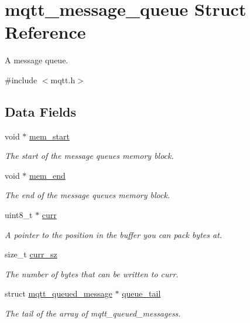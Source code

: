 \hypertarget{structmqtt__message__queue}{}\section{mqtt\+\_\+message\+\_\+queue Struct Reference}
\label{structmqtt__message__queue}


A message queue.  




{\ttfamily \#include $<$mqtt.\+h$>$}

\subsection*{Data Fields}
\begin{DoxyCompactItemize}
\item 
void $\ast$ \hyperlink{structmqtt__message__queue_a426875f05e72315ed1b34d324b60ac9b}{mem\+\_\+start}
\begin{DoxyCompactList}\small\item\em The start of the message queue\textquotesingle{}s memory block. \end{DoxyCompactList}\item 
void $\ast$ \hyperlink{structmqtt__message__queue_a07b338b8de56733f174ba367335bb8b0}{mem\+\_\+end}\hypertarget{structmqtt__message__queue_a07b338b8de56733f174ba367335bb8b0}{}\label{structmqtt__message__queue_a07b338b8de56733f174ba367335bb8b0}

\begin{DoxyCompactList}\small\item\em The end of the message queue\textquotesingle{}s memory block. \end{DoxyCompactList}\item 
uint8\+\_\+t $\ast$ \hyperlink{structmqtt__message__queue_a6fdfd281cd9d9ac4bfa69840e5cbd359}{curr}
\begin{DoxyCompactList}\small\item\em A pointer to the position in the buffer you can pack bytes at. \end{DoxyCompactList}\item 
size\+\_\+t \hyperlink{structmqtt__message__queue_a0fe32958dfdb1872f040d7f86ca9a4b9}{curr\+\_\+sz}
\begin{DoxyCompactList}\small\item\em The number of bytes that can be written to {\ttfamily curr}. \end{DoxyCompactList}\item 
struct \hyperlink{structmqtt__queued__message}{mqtt\+\_\+queued\+\_\+message} $\ast$ \hyperlink{structmqtt__message__queue_a7b3bbfe183900ced02927b883486d522}{queue\+\_\+tail}
\begin{DoxyCompactList}\small\item\em The tail of the array of mqtt\+\_\+queued\+\_\+messages\textquotesingle{}s. \end{DoxyCompactList}\end{DoxyCompactItemize}
